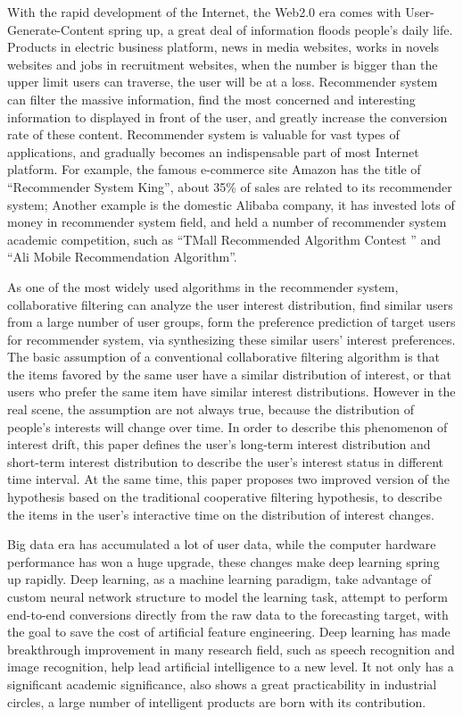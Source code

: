 \begin{eabstract}
With the rapid development of the Internet, the Web2.0 era comes with User-Generate-Content spring up,
a great deal of information floods people's daily life. Products in electric business platform, 
news in media websites, works in novels websites and jobs in recruitment websites,
when the number is bigger than the upper limit users can traverse, the user will be at a loss.
Recommender system can filter the massive information, 
find the most concerned and interesting information to displayed in front of the user,
and greatly increase the conversion rate of these content.
Recommender system is valuable for vast types of applications,
and gradually becomes an indispensable part of most Internet platform.
For example, the famous e-commerce site Amazon has the title of ``Recommender System King'',
about 35\% of sales are related to its recommender system;
Another example is the domestic Alibaba company,
it has invested lots of money in recommender system field,
and held a number of recommender system academic competition,
such as ``TMall Recommended Algorithm Contest '' and ``Ali Mobile Recommendation Algorithm''.

As one of the most widely used algorithms in the recommender system,
collaborative filtering can analyze the user interest distribution,
find similar users from a large number of user groups,
form the preference prediction of target users for recommender system,
via synthesizing these similar users' interest preferences.
The basic assumption of a conventional collaborative filtering algorithm is
that the items favored by the same user have a similar distribution of interest,
or that users who prefer the same item have similar interest distributions.
However in the real scene, the assumption are not always true,
because the distribution of people's interests will change over time.
In order to describe this phenomenon of interest drift,
this paper defines the user's long-term interest distribution and short-term interest distribution
to describe the user's interest status in different time interval.
At the same time, this paper proposes two improved version of the hypothesis
based on the traditional cooperative filtering hypothesis,
to describe the items in the user's interactive time on the distribution of interest changes.

Big data era has accumulated a lot of user data, while the computer hardware performance has
won a huge upgrade, these changes make deep learning spring up rapidly.
Deep learning, as a machine learning paradigm, take advantage of custom neural network structure
to model the learning task, attempt to perform end-to-end conversions directly from the raw data
to the forecasting target, with the goal to save the cost of artificial feature engineering.
Deep learning has made breakthrough improvement in many research field, such as speech recognition
and image recognition, help lead artificial intelligence to a new level.
It not only has a significant academic significance, also shows a great practicability in
industrial circles, a large number of intelligent products are born with its contribution.


\end{eabstract}
